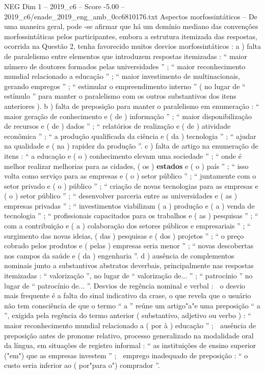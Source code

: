\begin{textsample}{NEG Dim 1 – 2019\_c6 – Score -5.00 – 2019\_c6/enade\_2019\_eng\_amb\_0cc6810176.txt}
Aspectos morfossintáticos – De uma maneira geral, pode -se afirmar que há um domínio mediano das convenções morfossintáticas pelos participantes, embora a estrutura itemizada das respostas, ocorrida na Questão 2, tenha favorecido muitos desvios morfossintáticos : a ) falta de paralelismo entre elementos que introduzem respostas itemizadas : “ maior número de doutores formados pelas universidades ” ; “ maior reconhecimento mundial relacionado a educação ” ; “ maior investimento de multinacionais, gerando empregos ” ; “ estimular o empreendimento interno ” ( no lugar de “ estímulo ” para manter o paralelismo com os outros substantivos dos itens anteriores ). b ) falta de preposição para manter o paralelismo em enumeração : “ maior geração de conhecimento e ( de ) informação ” ; “ maior disponibilização de recursos e ( de ) dados ” ; “ relatórios de realização e ( de ) atividade econômica ” ; “ a produção qualificada da ciência e ( da ) tecnologia ” ; “ ajudar na qualidade e ( na ) rapidez da produção ”. c ) falta de artigo na enumeração de itens : “ a educação e ( o ) conhecimento elevam uma sociedade ” ; “ onde é melhor realizar melhorias para as cidades, ( os ) \textbf{estados} e ( o ) país ” ; “ isso volta como serviço para as empresas e ( o ) setor público ” ; “ juntamente com o setor privado e ( o ) público ” ; “ criação de novas tecnologias para as empresas e ( o ) setor público ” ; “ desenvolver parceria entre as universidades e ( as ) empresas privadas ” ; “ investimentos viabilizam ( a ) produção e ( a ) venda de tecnologia ” ; “ profissionais capacitados para os trabalhos e ( as ) pesquisas ” ; “ com a contribuição e ( a ) colaboração dos setores públicos e empresariais ” ; “ surgimento das novas ideias, ( das ) pesquisas e ( dos ) projetos ” ; “ o preço cobrado pelos produtos e ( pelas ) empresas seria menor ” ; “ novas descobertas nos campos da saúde e ( da ) engenharia ”. d ) ausência de complementos nominais junto a substantivos abstratos deverbais, principalmente nas respostas itemizadas : “ valorização ”, no lugar de “ valorização de... ” ; “ patrocínio ” no lugar de “ patrocínio de... ”.
Desvios de regência nominal e verbal :  o desvio mais frequente é a falta do sinal indicativo da crase, o que revela que o usuário não tem consciência de que o termo “ a ” reúne um artigo"a"e uma preposição “ a ”, exigida pela regência do termo anterior ( substantivo, adjetivo ou verbo ) : “ maior reconhecimento mundial relacionado a ( por à ) educação ” ;  ausência de preposição antes de pronome relativo, processo generalizado na modalidade oral da língua, em situações de registro informal : “ as instituições de ensino superior ("em") que as empresas investem ” ;  emprego inadequado de preposição : “ o custo seria inferior ao ( por"para o") comprador ”.

\end{textsample}
